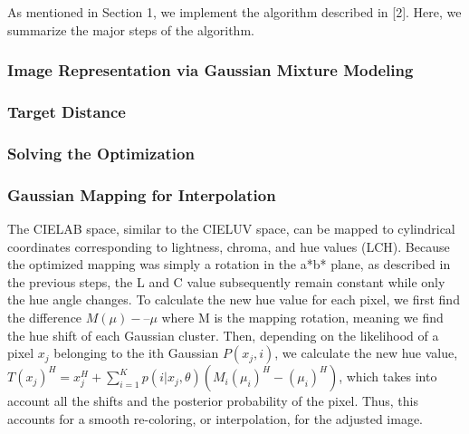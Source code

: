 \documentclass[10pt,twocolumn,letterpaper]{article}
\begin{document}
As mentioned in Section 1, we implement the algorithm described in [2]. Here, we summarize the major steps of the algorithm. 

\subsubsection{Image Representation via Gaussian Mixture Modeling}

\subsubsection{Target Distance}

\subsubsection{Solving the Optimization}

\subsubsection{Gaussian Mapping for Interpolation}

The CIELAB space, similar to the CIELUV space, can be mapped to cylindrical coordinates corresponding to lightness, chroma, and hue values (LCH). Because the optimized mapping was simply a rotation in the a*b* plane, as described in the previous steps, the L and C value subsequently remain constant while only the hue angle changes. To calculate the new hue value for each pixel, we first find the difference $M(\mu) -– \mu$ where M is the mapping rotation, meaning we find the hue shift of each Gaussian cluster. Then, depending on the likelihood of a pixel $x_j$ belonging to the ith Gaussian $P(x_j, i)$, we calculate the new hue value, 
$
T(x_j)^{H} = x_j^{H} + \sum\limits_{i=1}^K p(i|x_j, \theta)(M_i(\mu_i)^{H}-(\mu_i)^{H})
$,
which takes into account all the shifts and the posterior probability of the pixel.  Thus, this accounts for a smooth re-coloring, or interpolation, for the adjusted image. 
\end{document}
